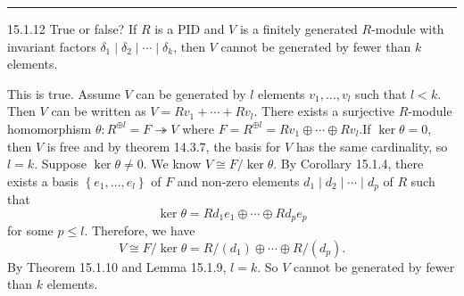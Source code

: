 \documentclass[a4paper, 12pt]{article}
\begin{document}
\noindent\rule{7in}{2.8pt}
\begin{problem}{15.1.12}
True or false? If \(R\) is a PID and \(V\) is a finitely generated \(R\)-module with invariant factors \(\delta_1\mid \delta_2\mid \cdots\mid \delta_k\), then 
\(V\) cannot be generated by fewer than \(k\) elements.
\end{problem}
\begin{solution}
This is true. Assume \(V\) can be generated by \(l\) elements \(v_1,\ldots,v_l\) such that \(l<k\). Then \(V\) can be written as \(V=Rv_1+\cdots+Rv_l\). There exists a surjective 
\(R\)-module homomorphism \(\theta:R^{\oplus l}=F\twoheadrightarrow V\) where \(F=R^{\oplus l}=Rv_1\oplus \cdots\oplus Rv_l\).If \(\ker \theta=0\), then \(V\) is free and by theorem 14.3.7, the basis for \(V\) has the same cardinality, so \(l=k\). Suppose \(\ker \theta\neq 0\). 
We know \(V\cong F/\ker \theta\). By Corollary 15.1.4, there exists a basis \(\left\{ e_1,\ldots,e_l \right\}\) of \(F\) and non-zero elements \(d_1\mid d_2\mid\cdots\mid d_p\) of \(R\) such that 
\[\ker\theta=Rd_1e_1\oplus \cdots\oplus Rd_pe_p\]
for some \(p\leq l\). Therefore, we have 
\[V\cong F/\ker \theta=R/(d_1)\oplus \cdots\oplus R/(d_p).\]
By Theorem 15.1.10 and Lemma 15.1.9, \(l=k\). So \(V\) cannot be generated by fewer than \(k\) elements. 
\end{solution}
\end{document}
